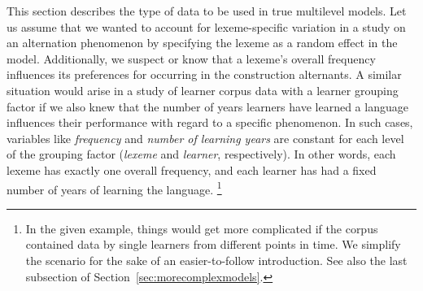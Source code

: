 \documentclass[a4paper,12pt]{article}
\begin{document}
This section describes the type of data to be used in true multilevel models.
Let us assume that we wanted to account for lexeme-specific variation in a study on an alternation phenomenon by specifying the lexeme as a random effect in the model.
Additionally, we suspect or know that a lexeme's overall frequency influences its preferences for occurring in the construction alternants.
A similar situation would arise in a study of learner corpus data with a learner grouping factor if we also knew that the number of years learners have learned a language influences their performance with regard to a specific phenomenon.
In such cases, variables like \textit{frequency} and \textit{number of learning years} are constant for each level of the grouping factor (\textit{lexeme} and \textit{learner}, respectively).
In other words, each lexeme has exactly one overall frequency, and each learner has had a fixed number of years of learning the language.%
\footnote{In the given example, things would get more complicated if the corpus contained data by single learners from different points in time.
We simplify the scenario for the sake of an easier-to-follow introduction.
See also the last subsection of Section~\ref{sec:morecomplexmodels}.}
\end{document}
